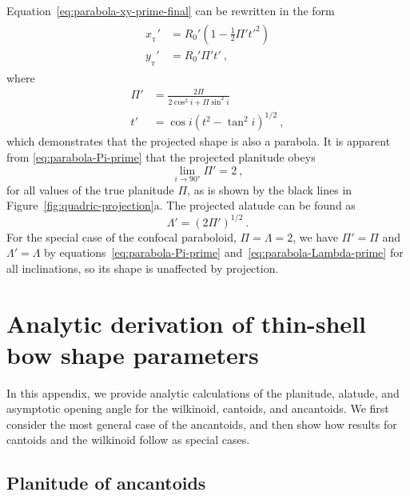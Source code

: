 \documentclass[useAMS, usenatbib, a4paper]{mnras}
\newcommand\T{_{\mathrm{\scriptscriptstyle T}}}
\begin{document}
Equation~\eqref{eq:parabola-xy-prime-final} can be rewritten in the
form
\begin{gather}
  \label{eq:parabola-xy-all-primes}
  \begin{aligned}
    x_{\T}' &= R_0' \left(1  - \tfrac{1}{2} \Pi' t'^2\right) \\
    y_{\T}' &= R_0' \Pi' t' \ ,
  \end{aligned}
\end{gather}
where
\begin{align}
  \label{eq:parabola-Pi-prime}
  \Pi' &= \frac{2 \Pi} {2 \cos^2 i + \Pi \sin^2 i} \\
  \label{eq:parabola-t-prime}
  t' &= \cos i \left(t^2 - \tan^2 i\right)^{1/2} \ ,
\end{align}
which demonstrates that the projected shape is also a parabola. It is
apparent from \eqref{eq:parabola-Pi-prime} that the projected
planitude obeys
\begin{equation*}
\lim_{i \to \ang{90}} \Pi' = 2 \ ,
\end{equation*}
for all values of the true planitude \(\Pi\), as is shown by the black
lines in Figure~\ref{fig:quadric-projection}a. The projected alatude can
be found as
\begin{equation}
  \label{eq:parabola-Lambda-prime}
  \Lambda' = \left( 2 \Pi' \right)^{1/2} \ .
\end{equation}
For the special case of the confocal paraboloid,
\(\Pi = \Lambda = 2\), we have \(\Pi' = \Pi\) and
\(\Lambda' = \Lambda\) by equations~\eqref{eq:parabola-Pi-prime}
and~\eqref{eq:parabola-Lambda-prime} for all inclinations, so its
shape is unaffected by projection.
\section{Analytic derivation of thin-shell bow shape parameters}
\label{sec:thin-shell-shapes}

In this appendix, we provide analytic calculations of the planitude,
alatude, and asymptotic opening angle for the wilkinoid, cantoids, and
ancantoids.  We first consider the most general case of the
ancantoids, and then show how results for cantoids and the wilkinoid
follow as special cases.

\subsection{Planitude of ancantoids}
\label{sec:ancantoid-planitude}
\end{document}
